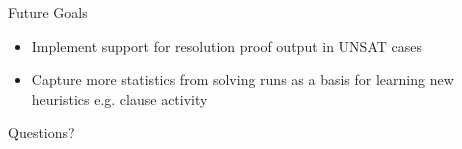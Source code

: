 \documentclass{beamer}
\begin{document}
\begin{frame}{Future Goals}
    \begin{itemize}[<+->]
        \item Implement support for resolution proof output in UNSAT cases
        \item Capture more statistics from solving runs as a basis for learning new heuristics e.g. clause activity
    \end{itemize}
\end{frame}

\begin{frame}{}
    \begin{center}
        \Large
        Questions?
    \end{center}
\end{frame}



\end{document}
